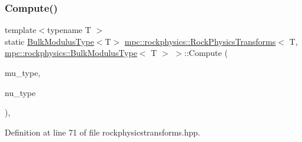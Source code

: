 \subsubsection{\texorpdfstring{Compute()}{Compute()}\hspace{0.1cm}{\footnotesize\ttfamily [4/8]}}
{\footnotesize\ttfamily template$<$typename T $>$ \\
static \mbox{\hyperlink{structmpc_1_1rockphysics_1_1_bulk_modulus_type}{Bulk\+Modulus\+Type}}$<$T$>$ \mbox{\hyperlink{structmpc_1_1rockphysics_1_1_rock_physics_transforms}{mpc\+::rockphysics\+::\+Rock\+Physics\+Transforms}}$<$ T, \mbox{\hyperlink{structmpc_1_1rockphysics_1_1_bulk_modulus_type}{mpc\+::rockphysics\+::\+Bulk\+Modulus\+Type}}$<$ T $>$ $>$\+::Compute (\begin{DoxyParamCaption}\item[{const \mbox{\hyperlink{structmpc_1_1rockphysics_1_1_shear_modulus_type}{mpc\+::rockphysics\+::\+Shear\+Modulus\+Type}}$<$ T $>$ \&}]{mu\+\_\+type,  }\item[{const \mbox{\hyperlink{structmpc_1_1rockphysics_1_1_poissons_ratio_type}{mpc\+::rockphysics\+::\+Poissons\+Ratio\+Type}}$<$ T $>$ \&}]{nu\+\_\+type }\end{DoxyParamCaption})\hspace{0.3cm}{\ttfamily [inline]}, {\ttfamily [static]}}



Definition at line 71 of file rockphysicstransforms.\+hpp.

\mbox{\label{structmpc_1_1rockphysics_1_1_rock_physics_transforms_3_01_t_00_01mpc_1_1rockphysics_1_1_bulk_modulus_type_3_01_t_01_4_01_4_a34cdaa1d293d2109361b218e0d40edef}} 
